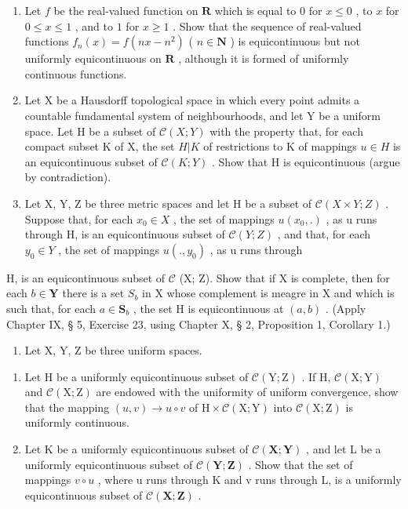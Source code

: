 \ExerciseSection

\begin{enumerate}
\def\labelenumi{\arabic{enumi})}
\item
  Let \(f\) be the real-valued function on \(\mathbf{R}\) which is equal to \(0\) for \(x \leqslant 0\) , to \(x\) for \(0 \leqslant x \leqslant 1\) , and to \(1\) for \(x \geqslant 1\) . Show that the sequence of real-valued functions \(f_n(x) = f(nx - n^2)\) ( \(n \in \mathbf{N}\) ) is equicontinuous but not uniformly equicontinuous on \(\mathbf{R}\) , although it is formed of uniformly continuous functions.
\item
  Let X be a Hausdorff topological space in which every point admits a countable fundamental system of neighbourhoods, and let Y be a uniform space. Let H be a subset of \(\mathcal{C}(X;Y)\) with the property that, for each compact subset K of X, the set \(H|K\) of restrictions to K of mappings \(u\in H\) is an equicontinuous subset of \(\mathcal{C}(K;Y)\) . Show that H is equicontinuous (argue by contradiction).
\item
  Let X, Y, Z be three metric spaces and let H be a subset of \(\mathcal{C}(X \times Y; Z)\) . Suppose that, for each \(x_{0} \in X\) , the set of mappings \(u(x_{0}, .)\) , as u runs through H, is an equicontinuous subset of \(\mathcal{C}(Y; Z)\) , and that, for each \(y_{0} \in Y\) , the set of mappings \(u(., y_{0})\) , as u runs through
\end{enumerate}

H, is an equicontinuous subset of \(\mathcal{C}\) (X; Z). Show that if X is complete, then for each \(b \in \mathbf{Y}\) there is a set \(S_b\) in X whose complement is meagre in X and which is such that, for each \(a \in \mathbf{S}_b\) , the set H is equicontinuous at \((a, b)\) . (Apply Chapter IX, § 5, Exercise 23, using Chapter X, § 2, Proposition 1, Corollary 1.)

\begin{enumerate}
\def\labelenumi{\arabic{enumi})}
\setcounter{enumi}{3}
\tightlist
\item
  Let X, Y, Z be three uniform spaces.
\end{enumerate}

\begin{enumerate}
\def\labelenumi{\alph{enumi})}
\item
  Let H be a uniformly equicontinuous subset of \(\mathcal{C}(\mathrm{Y};\mathrm{Z})\) . If H, \(\mathcal{C}(\mathrm{X};\mathrm{Y})\) and \(\mathcal{C}(\mathrm{X};\mathrm{Z})\) are endowed with the uniformity of uniform convergence, show that the mapping \((u,v)\to u\circ v\) of \(\mathrm{H}\times \mathcal{C}(\mathrm{X};\mathrm{Y})\) into \(\mathcal{C}(\mathrm{X};\mathrm{Z})\) is uniformly continuous.
\item
  Let K be a uniformly equicontinuous subset of \(\mathcal{C}(\mathbf{X};\mathbf{Y})\) , and let L be a uniformly equicontinuous subset of \(\mathcal{C}(\mathbf{Y};\mathbf{Z})\) . Show that the set of mappings \(v \circ u\) , where u runs through K and v runs through L, is a uniformly equicontinuous subset of \(\mathcal{C}(\mathbf{X};\mathbf{Z})\) .
\end{enumerate}

